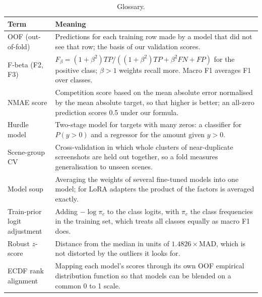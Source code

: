 \begin{table}[H]\centering\small
\captionsetup{justification=raggedright,singlelinecheck=false}

\begin{tabular}{@{}L{.24\linewidth}L{.70\linewidth}@{}}
\toprule
\textbf{Term} & \textbf{Meaning} \\
\midrule
OOF (out-of-fold) & Predictions for each training row made by a model that did not see that row; the basis of our validation scores. \\
F-beta (F2, F3) & $F_\beta = (1+\beta^2)TP/((1+\beta^2)TP + \beta^2 FN + FP)$ for the positive class; $\beta>1$ weights recall more. Macro F1 averages F1 over classes. \\
NMAE score & Competition score based on the mean absolute error normalised by the mean absolute target, so that higher is better; an all-zero prediction scores 0.5 under our formula. \\
Hurdle model & Two-stage model for targets with many zeros: a classifier for $P(y>0)$ and a regressor for the amount given $y>0$. \\
Scene-group CV & Cross-validation in which whole clusters of near-duplicate screenshots are held out together, so a fold measures generalisation to unseen scenes. \\
Model soup & Averaging the weights of several fine-tuned models into one model; for LoRA adapters the product of the factors is averaged exactly. \\
Train-prior logit adjustment & Adding $-\log\pi_c$ to the class logits, with $\pi_c$ the class frequencies in the training set, which treats all classes equally as macro F1 does. \\
Robust $z$-score & Distance from the median in units of $1.4826\times$MAD, which is not distorted by the outliers it looks for. \\
ECDF rank alignment & Mapping each model's scores through its own OOF empirical distribution function so that models can be blended on a common 0 to 1 scale. \\
\bottomrule
\end{tabular}
\caption{Glossary.}\label{tab:glossary}
\end{table}
